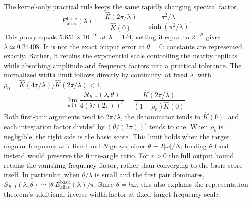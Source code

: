 The kernel-only practical rule keeps the same rapidly changing spectral
factor,
\begin{equation}
 E_{\mathrm{alias}}^{\mathrm{basic}}(\lambda)
 :=\frac{\widehat K(2\pi/\lambda)}{\widehat K(0)}
 =\frac{\pi^2/\lambda}{\sinh(\pi^2/\lambda)}.
 \label{eq:lambda-basic-appendix}
\end{equation}
This proxy equals $5.651\times10^{-16}$ at $\lambda=1/4$; setting it
equal to $2^{-52}$ gives $\lambda\simeq0.24408$.
It is not the exact output error at $\theta=0$: constants are represented
exactly. Rather, it retains the exponential scale controlling the nearby
replicas while absorbing amplitude and frequency factors into a practical
tolerance. The normalized width limit follows directly by continuity:
at fixed $\lambda$, with
$\rho_0=\widehat K(4\pi/\lambda)/\widehat K(2\pi/\lambda)<1$,
\begin{equation}
 \lim_{\theta\downarrow0}
 \frac{\mathcal R_{K,r}(\lambda,\theta)}{4(\theta/(2\pi))^r}
 =\frac{\widehat K(2\pi/\lambda)}{(1-\rho_0)\widehat K(0)}.
 \label{eq:lambda-zero-angle-limit}
\end{equation}
Both first-pair arguments tend to $2\pi/\lambda$, the denominator tends
to $\widehat K(0)$, and each integration factor divided by $(\theta/(2\pi))^r$
tends to one. When $\rho_0$ is negligible, the right side is the basic
score. This limit holds when the target angular frequency $\omega$ is
fixed and $N$ grows, since $\theta=2|\omega|/N$; holding $\theta$ fixed
instead would preserve the finite-angle ratio. For $r>0$ the full output
bound retains the vanishing frequency factor, rather than converging to
the basic score itself. In particular, when $\theta/\lambda$ is small and the first pair dominates,
$S_{K,1}(\lambda,\theta)\simeq
|\theta|E_{\mathrm{alias}}^{\mathrm{basic}}(\lambda)/\pi$.
Since $\theta=h\omega$, this also explains the representation theorem's
additional inverse-width factor at fixed target frequency scale.

